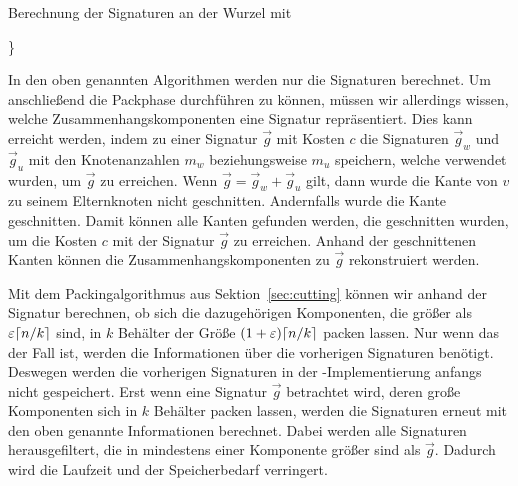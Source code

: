\begin{algorithm}[H]
    \caption{Berechnung der Signaturen an der Wurzel mit \carfun{}}\label{alg:carfun}
    \begin{algorithmic}[1]
                    \}
                \EndFor
           \EndFor
        \EndFunction
    \end{algorithmic}
\end{algorithm}

\begin{rem}\label{rem:components}
    In den oben genannten Algorithmen werden nur die Signaturen berechnet.
    Um anschließend die Packphase durchführen zu können, müssen wir allerdings wissen, welche Zusammenhangskomponenten eine Signatur repräsentiert.
    Dies kann erreicht werden, indem zu einer Signatur $\vec{g}$ mit Kosten $c$ die Signaturen $\vec{g}_w$ und $\vec{g}_u$ mit den Knotenanzahlen $m_w$ beziehungsweise $m_u$ speichern, welche verwendet wurden, um $\vec{g}$ zu erreichen.
    Wenn $\vec{g} = \vec{g}_w + \vec{g}_u$ gilt, dann wurde die Kante von $v$ zu seinem Elternknoten nicht geschnitten.
    Andernfalls wurde die Kante geschnitten.
    Damit können alle Kanten gefunden werden, die geschnitten wurden, um die Kosten $c$ mit der Signatur $\vec{g}$ zu erreichen.
    Anhand der geschnittenen Kanten können die Zusammenhangskomponenten zu $\vec{g}$ rekonstruiert werden.

    Mit dem Packingalgorithmus aus Sektion~\ref{sec:cutting} können wir anhand der Signatur berechnen, ob sich die dazugehörigen Komponenten, die größer als $\varepsilon \lceil n/k\rceil$ sind, in $k$ Behälter der Größe $(1+\varepsilon) \lceil n/k\rceil$ packen lassen.
    Nur wenn das der Fall ist, werden die Informationen über die vorherigen Signaturen benötigt.
    Deswegen werden die vorherigen Signaturen in der \Cpp{}\hyp Implementierung anfangs nicht gespeichert.
    Erst wenn eine Signatur $\vec{g}$ betrachtet wird, deren große Komponenten sich in $k$ Behälter packen lassen, werden die Signaturen erneut mit den oben genannte Informationen berechnet.
    Dabei werden alle Signaturen herausgefiltert, die in mindestens einer Komponente größer sind als $\vec{g}$.
    Dadurch wird die Laufzeit und der Speicherbedarf verringert.
\end{rem}

